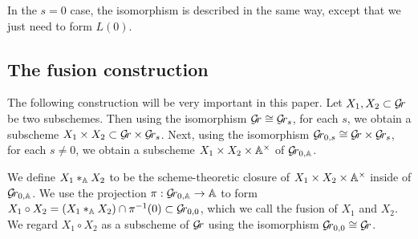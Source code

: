 \documentclass[draft]{article}
\begin{document}
\begin{enumerate}
    In the $ s = 0 $ case, the isomorphism is described in the same way, except that we just need to form $ L(0)$.
    
\end{enumerate}

\subsection{The fusion construction}
The following construction will be very important in this paper.  Let $ X_1, X_2 \subset \Gr$ be two subschemes. Then using the isomorphism $ \Gr \cong \Gr_s $, for each $ s $, we obtain a subscheme $ X_1 \times X_2 \subset \Gr \times \Gr_s $.  
Next, using the isomorphism $ \Gr_{0,s} \cong \Gr \times \Gr_s $, 
for each $ s \ne 0$,  
we obtain a subscheme $ X_1 \times X_2 \times \AA^\times $  of $\Grbd$.  

We define $ X_1 \ast_{\AA} X_2 $ to be the scheme-theoretic closure of $ X_1 \times X_2 \times \AA^\times $ inside of $ \Grbd $.  
We use the projection $ \pi: \Grbd \rightarrow \AA $ to form $ X_1 \circ X_2 = (X_1 \ast_\AA X_2) \cap \pi^{-1}(0) \subset \Gr_{0,0} $, which we call the fusion of $ X_1 $ and $X_2$.  
We regard $ X_1 \circ X_2$ as a subscheme of $ \Gr $ using {the isomorphism} $\Gr_{0,0} \cong \Gr $. 

\end{document}
